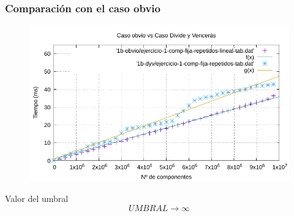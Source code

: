 \documentclass[13pt]{beamer}
\begin{document}
    \begin{frame}
        \frametitle{Comparación con el caso obvio}

        \begin{figure}
            \centering
            \includegraphics[scale=0.66]{img/e1b-comp.pdf}
            \label{fig:1b-comp}
        \end{figure}

        \begin{alertblock}{Valor del umbral}
            \begin{equation}
                UMBRAL \rightarrow \infty
            \end{equation}
        \end{alertblock}

    \end{frame}


\end{document}
